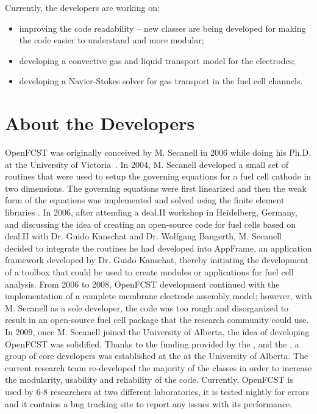 Currently, the developers are working on:
\begin{itemize}
 \item improving the code readability – new classes are being developed for making the code easier to understand and more modular;
 \item developing a convective gas and liquid transport model for the electrodes;
 \item developing a Navier-Stokes solver for gas transport in the fuel cell channels.
\end{itemize}

\section{About the Developers}

OpenFCST was originally conceived by M. Secanell in 2006 while doing his Ph.D. at the University of Victoria~\cite{Secanell07}. In 2004, M. Secanell developed a small set of routines that were used to setup the governing equations for a fuel cell cathode in two dimensions. The governing equations were first linearized and then the weak form of the equations was implemented and solved using the  finite element libraries \cite{Secanell07b}. In 2006, after attending a deal.II workshop in Heidelberg, Germany, and discussing the idea of creating an open-source code for fuel cells based on deal.II with Dr. Guido Kanschat and Dr. Wolfgang Bangerth, M. Secanell decided to integrate the routines he had developed into AppFrame, an application framework developed by Dr. Guido Kanschat, thereby initiating the development of a toolbox that could be used to create modules or applications for fuel cell analysis. From 2006 to 2008, OpenFCST development continued with the implementation of a complete membrane electrode assembly model; however, with M. Secanell as a sole developer, the code was too rough and disorganized to result in an open-source fuel cell package that the research community could use. In 2009, once M. Secanell joined the University of Alberta, the idea of developing OpenFCST was solidified. Thanks to the funding provided by the ,  and the , a group of core developers was established at the  at the University of Alberta. The current research team re-developed the majority of the classes in order to increase the modularity, usability and reliability of the code. Currently, OpenFCST is used by 6-8 researchers at two different laboratories, it is 
tested nightly for errors and it contains a bug tracking site to report any issues with its performance.

